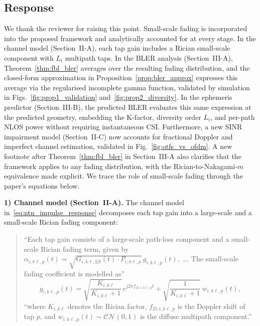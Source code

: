 \subsection{Response}

We thank the reviewer for raising this point. Small-scale fading is incorporated into the proposed framework and analytically accounted for at every stage. In the channel model (Section~II-A), each tap gain includes a Rician small-scale component with $L_i$ multipath taps. In the BLER analysis (Section~III-A), Theorem~\ref{thm:fbl_bler} averages over the resulting fading distribution, and the closed-form approximation in Proposition~\ref{prop:bler_approx} expresses this average via the regularised incomplete gamma function, validated by simulation in Figs.~\ref{fig:prop1_validation} and~\ref{fig:prop2_diversity}. In the ephemeris predictor (Section~III-B), the predicted BLER evaluates this same expression at the predicted geometry, embedding the K-factor, diversity order $L_i$, and per-path NLOS power without requiring instantaneous CSI. Furthermore, a new SINR impairment model (Section~II-C) now accounts for fractional Doppler and imperfect channel estimation, validated in Fig.~\ref{fig:otfs_vs_ofdm}. A new footnote after Theorem~\ref{thm:fbl_bler} in Section~III-A also clarifies that the framework applies to any fading distribution, with the Rician-to-Nakagami-$m$ equivalence made explicit. We trace the role of small-scale fading through the paper's equations below.

\textbf{1) Channel model (Section~II-A).}
The channel model in~\eqref{eq:ntn_impulse_response} decomposes each tap gain into a large-scale and a small-scale Rician fading component:

\begin{quote}
``Each tap gain consists of a large-scale path-loss component and a small-scale Rician fading term, given by
$\alpha_{i,k\ell,p}(t) = \sqrt{G_{i,k\ell,\mathrm{LS}}(t) \cdot P_{i,k\ell,p}}\, g_{i,k\ell,p}(t),$
$\ldots$ The small-scale fading coefficient is modelled as''
\begin{equation*}
g_{i,k\ell,p}(t) = \sqrt{\frac{K_{i,k\ell}}{K_{i,k\ell}+1}}\,
e^{j2\pi f_{D,i,k\ell,p}t} + \sqrt{\frac{1}{K_{i,k\ell}+1}}\,
w_{i,k\ell,p}(t),
\end{equation*}
``where $K_{i,k\ell}$ denotes the Rician factor, $f_{D,i,k\ell,p}$
is the Doppler shift of tap $p$, and
$w_{i,k\ell,p}(t)\sim\mathcal{CN}(0,1)$ is the diffuse multipath
component.''
\end{quote}


